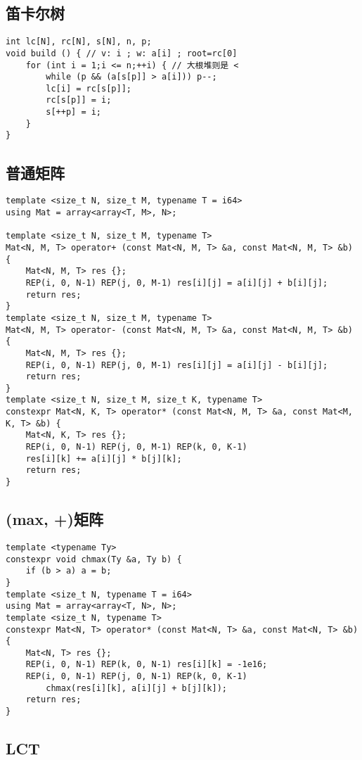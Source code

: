\documentclass[a4paper,landscape,twocolumn]{ctexart}
\begin{document}
\subsection{笛卡尔树}

\begin{lstlisting}
int lc[N], rc[N], s[N], n, p;
void build () { // v: i ; w: a[i] ; root=rc[0]
	for (int i = 1;i <= n;++i) { // 大根堆则是 <
		while (p && (a[s[p]] > a[i])) p--;
		lc[i] = rc[s[p]];
		rc[s[p]] = i;
		s[++p] = i;
	}
}
\end{lstlisting}

\subsection{普通矩阵}

\begin{lstlisting}
template <size_t N, size_t M, typename T = i64>
using Mat = array<array<T, M>, N>;

template <size_t N, size_t M, typename T>
Mat<N, M, T> operator+ (const Mat<N, M, T> &a, const Mat<N, M, T> &b) {
	Mat<N, M, T> res {};
	REP(i, 0, N-1) REP(j, 0, M-1) res[i][j] = a[i][j] + b[i][j];
	return res;
}
template <size_t N, size_t M, typename T>
Mat<N, M, T> operator- (const Mat<N, M, T> &a, const Mat<N, M, T> &b) {
	Mat<N, M, T> res {};
	REP(i, 0, N-1) REP(j, 0, M-1) res[i][j] = a[i][j] - b[i][j];
	return res;
}
template <size_t N, size_t M, size_t K, typename T>
constexpr Mat<N, K, T> operator* (const Mat<N, M, T> &a, const Mat<M, K, T> &b) {
	Mat<N, K, T> res {};
	REP(i, 0, N-1) REP(j, 0, M-1) REP(k, 0, K-1)
	res[i][k] += a[i][j] * b[j][k];
	return res;
}
\end{lstlisting}

\subsection{(max, +)矩阵}

\begin{lstlisting}
template <typename Ty>
constexpr void chmax(Ty &a, Ty b) {
	if (b > a) a = b;
}
template <size_t N, typename T = i64>
using Mat = array<array<T, N>, N>;
template <size_t N, typename T>
constexpr Mat<N, T> operator* (const Mat<N, T> &a, const Mat<N, T> &b) {
	Mat<N, T> res {};
	REP(i, 0, N-1) REP(k, 0, N-1) res[i][k] = -1e16;
	REP(i, 0, N-1) REP(j, 0, N-1) REP(k, 0, K-1)
		chmax(res[i][k], a[i][j] + b[j][k]);
	return res;
}
\end{lstlisting}

\subsection{LCT}
\end{document}
